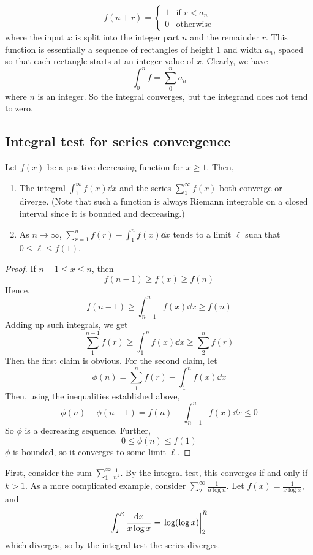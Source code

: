 \begin{enumerate}[(1)]
	      \[
		      f(n + r) = \begin{cases}
			      1 & \text{if } r < a_n \\
			      0 & \text{otherwise}
		      \end{cases}
	      \]
	      where the input \(x\) is split into the integer part \(n\) and the remainder \(r\).
	      This function is essentially a sequence of rectangles of height 1 and width \(a_n\), spaced so that each rectangle starts at an integer value of \(x\).
	      Clearly, we have
	      \[
		      \int_0^n f = \sum_0^n a_n
	      \]
	      where \(n\) is an integer.
	      So the integral converges, but the integrand does not tend to zero.
\end{enumerate}

\subsection{Integral test for series convergence}
\begin{theorem}
	Let \(f(x)\) be a positive decreasing function for \(x \geq 1\).
	Then,
	\begin{enumerate}[(1)]
		\item The integral \(\int_1^\infty f(x) \dd{x}\) and the series \(\sum_1^\infty f(x)\) both converge or diverge.
		      (Note that such a function is always Riemann integrable on a closed interval since it is bounded and decreasing.)
		\item As \(n \to \infty\), \(\sum_{r=1}^n f(r) - \int_1^n f(x) \dd{x}\) tends to a limit \(\ell\) such that \(0 \leq \ell \leq f(1)\).
	\end{enumerate}
\end{theorem}
\begin{proof}
	If \(n-1 \leq x \leq n\), then
	\[
		f(n-1) \geq f(x) \geq f(n)
	\]
	Hence,
	\[
		f(n-1) \geq \int_{n-1}^n f(x) \dd{x} \geq f(n)
	\]
	Adding up such integrals, we get
	\[
		\sum_1^{n-1} f(r) \geq \int_1^n f(x) \dd{x} \geq \sum_2^{n} f(r)
	\]
	Then the first claim is obvious.
	For the second claim, let
	\[
		\phi(n) = \sum_1^n f(r) - \int_1^n f(x) \dd{x}
	\]
	Then, using the inequalities established above,
	\[
		\phi(n) - \phi(n-1) = f(n) - \int_{n-1}^n f(x) \dd{x} \leq 0
	\]
	So \(\phi\) is a decreasing sequence.
	Further,
	\[
		0 \leq \phi(n) \leq f(1)
	\]
	\(\phi\) is bounded, so it converges to some limit \(\ell\).
\end{proof}
\begin{example}
	First, consider the sum \(\sum_1^\infty \frac{1}{n^k}\).
	By the integral test, this converges if and only if \(k > 1\).
	As a more complicated example, consider \(\sum_2^\infty \frac{1}{n\log n}\).
	Let \(f(x) = \frac{1}{x\log x}\), and
	\[
		\int_2^R \frac{\dd{x}}{x\log x} = \eval{\log(\log x)}_2^R
	\]
	which diverges, so by the integral test the series diverges.
\end{example}
